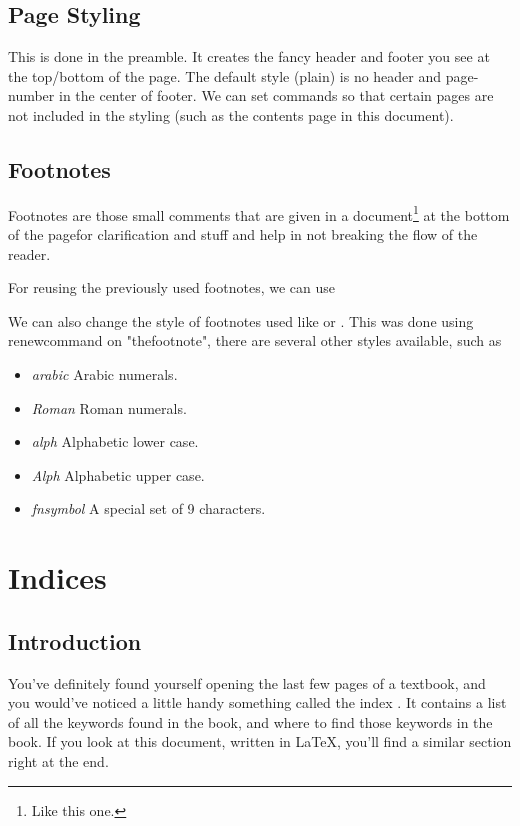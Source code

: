 \documentclass[12pt letterpaper]{article}
\begin{document}
    \subsection{Page Styling}
    This is done in the preamble. 
    It creates the fancy header and footer you see at the top/bottom of the page. 
    The default style (plain) is no header and page-number in the center of footer.
    We can set commands so that certain pages are not included in the styling (such as 
    the contents page in this document). 

    \subsection{Footnotes}
    Footnotes are those small comments that are given in a document\footnote{Like this one.} at the bottom
    of the page\footnotemark[2] for clarification and stuff and help in not breaking the flow of the 
    reader.

    For reusing the previously used footnotes, we can use\footnotemark[\value{footnote}]
    
    \renewcommand{\thefootnote}{\fnsymbol{footnote}}
    We can also change the style of footnotes used like \footnotemark[3] or \footnotemark[4].
    This was done using renewcommand on "thefootnote", there are several other styles available, such as
    \begin{itemize}
        \item {\emph{arabic} Arabic numerals.}
        \item {\emph{Roman} Roman numerals.}
        \item {\emph{alph} Alphabetic lower case.}
        \item {\emph{Alph} Alphabetic upper case.}
        \item {\emph{fnsymbol} A special set of 9 characters.}
    \end{itemize}


\clearpage

\section{Indices}
    \subsection{Introduction}
    You’ve definitely found yourself opening the last few pages of a textbook,
    and you would’ve noticed a little handy something called the index . 
    It contains a list of all the keywords  found in the book, and where to find those keywords 
    in the book. If you look at this document, written in \LaTeX \index{\LaTeX}, you’ll find a similar section right at the end.
\end{document}
